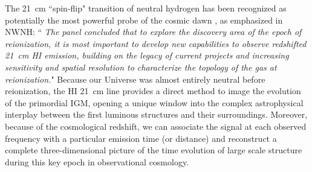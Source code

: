 \documentclass[preprint]{aastex}
\newcommand{\Mycitep}[1]{{\bf \citep{#1}}}
\def\HI{{H{\small I }}}
\begin{document}
The 21~cm ``spin-flip" transition of  neutral hydrogen has been recognized as potentially the most powerful probe 
of the cosmic dawn \Mycitep{morales_wyithe2010, furlanetto_et_al2006}, as emphasized in NWNH: 
``{\it 
The panel concluded that  to explore the discovery area of the epoch of reionization, it is most important to 
develop new capabilities to observe redshifted 21~cm \HI emission, building on the legacy of current projects and 
increasing sensitivity and spatial resolution to characterize the topology of the gas at reionization.}"  Because 
our Universe was almost entirely neutral before reionization, the HI 21~cm line provides a direct method to image 
the evolution of the primordial IGM, opening a unique window into the complex astrophysical interplay between the 
first luminous structures and their surroundings. Moreover, because of the cosmological redshift, we can associate 
the signal at each observed frequency with a particular emission time (or distance) and reconstruct a complete 
three-dimensional picture of the time evolution of large scale structure during this key epoch in 
observational cosmology. 
\end{document}
